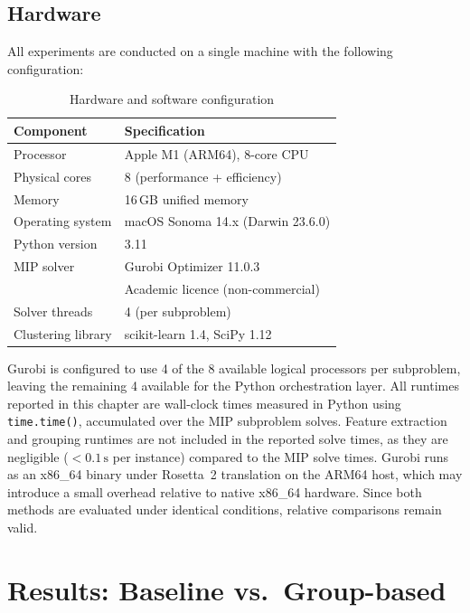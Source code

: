\subsection{Hardware}
\label{subsec:hardware}
All experiments are conducted on a single machine with the
following configuration:
\begin{table}[htbp]
\centering
\renewcommand{\arraystretch}{1.4}
\caption{Hardware and software configuration}
\label{tab:hardware}
\begin{tabular}{ll}
\hline
\textbf{Component}    & \textbf{Specification} \\
\hline
Processor             & Apple M1 (ARM64), 8-core CPU \\
Physical cores        & 8 (performance + efficiency) \\
Memory                & 16\,GB unified memory \\
Operating system      & macOS Sonoma 14.x (Darwin 23.6.0) \\
\hline
Python version        & 3.11 \\
MIP solver            & Gurobi Optimizer 11.0.3 \\
                      & Academic licence (non-commercial) \\
Solver threads        & 4 (per subproblem) \\
Clustering library    & scikit-learn 1.4, SciPy 1.12 \\
\hline
\end{tabular}
\end{table}
\noindent
Gurobi is configured to use 4 of the 8 available logical
processors per subproblem, leaving the remaining 4 available
for the Python orchestration layer. All runtimes reported in
this chapter are wall-clock times measured in Python using
\texttt{time.time()}, accumulated over the MIP subproblem
solves. Feature extraction and grouping runtimes are not
included in the reported solve times, as they are negligible
($<0.1\,\text{s}$ per instance) compared to the MIP solve
times.
Gurobi runs as an x86\_64 binary under Rosetta~2 translation
on the ARM64 host, which may introduce a small overhead
relative to native x86\_64 hardware. Since both methods are
evaluated under identical conditions, relative comparisons
remain valid.
\section{Results: Baseline vs.\ Group-based}
\label{sec:baseline_vs_group}
